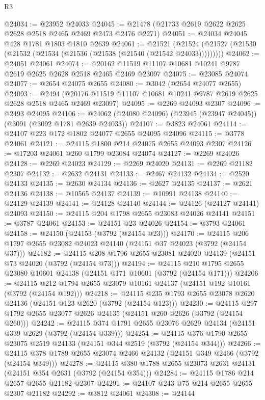 \begin{lexlean}{R3}
\begin{coremodule}
@24034 := @23952 @24033
@24045 := @21478 (@21733 @2619 @2622 @2625 @2628 @2518 @2465 @2469 @2473 @2476 @2271)
@24051 := @24034 @24045 @428 @1781 @1803 @1810 @2639
@24061 := @21521
    (@21524 (@21527 (@21530 (@21532 (@21534 (@21536 (@21538 (@21540 (@21542 @24033)))))))))
@24062 := @24051 @24061
@24074 := @20162 @11519 @11107 @10681 @10241 @9787 @2619 @2625 @2628 @2518 @2465 @2469 @23097
@24075 := @23085 @24074
@24077 := @2654 @24075 @2655
@24080 := @3042 (@2654 @24077 @2655)
@24093 := @2494
    (@20176 @11519 @11107 @10681 @10241 @9787 @2619 @2625 @2628 @2518 @2465 @2469 @23097)
@24095 := @2269 @24093 @2307
@24096 := @2493 @24095
@24106 := @24062 (@24080 @24096) (@23945 (@23947 @24045)) (@3091 (@3092 @1781 @2639 @24033))
@24107 := @3823 @24061
@24114 := @24107 @223 @172 @1802 @24077 @2655 @24095 @24096
@24115 := @3778 @24061
@24121 := @24115 @1800 @214 @24075 @2655 @24093 @2307
@24126 := @17203 @24061 @260 @1799 @23084 @24074
@24127 := @2269 @24026
@24128 := @2269 @24023
@24129 := @2269 @24020
@24131 := @2269 @21182 @2307
@24132 := @2632 @24131
@24133 := @2467 @24132
@24134 := @2520 @24133
@24135 := @2630 @24134
@24136 := @2627 @24135
@24137 := @2621 @24136
@24138 := @10565 @24137
@24139 := @10991 @24138
@24140 := @24129 @24139
@24141 := @24128 @24140
@24144 := @24126 (@24127 @24141) @24093
@24150 := @24115 @204 @1798 @2655 @23083 @24026 @24141
@24151 := @3787 @24061
@24153 := @24151 @23 @24026
@24154 := @3793 @24061
@24158 := @24150 (@24153 (@3792 (@24154 @23)))
@24170 := @24115 @206 @1797 @2655 @23082 @24023 @24140 (@24151 @37 @24023 (@3792 (@24154 @37)))
@24182 := @24115 @208 @1796 @2655 @23081 @24020 @24139 (@24151 @73 @24020 (@3792 (@24154 @73)))
@24194 := @24115 @210 @1795 @2655 @23080 @10601 @24138 (@24151 @171 @10601 (@3792 (@24154 @171)))
@24206 := @24115 @212 @1794 @2655 @23079 @10161 @24137 (@24151 @192 @10161 (@3792 (@24154 @192)))
@24218 := @24115 @235 @1793 @2655 @23078 @2620 @24136 (@24151 @123 @2620 (@3792 (@24154 @123)))
@24230 := @24115 @297 @1792 @2655 @23077 @2626 @24135 (@24151 @260 @2626 (@3792 (@24154 @260)))
@24242 := @24115 @374 @1791 @2655 @23076 @2629 @24134 (@24151 @339 @2629 (@3792 (@24154 @339)))
@24254 := @24115 @376 @1790 @2655 @23075 @2519 @24133 (@24151 @344 @2519 (@3792 (@24154 @344)))
@24266 := @24115 @378 @1789 @2655 @23074 @2466 @24132 (@24151 @349 @2466 (@3792 (@24154 @349)))
@24278 := @24115 @380 @1788 @2655 @23073 @2631 @24131 (@24151 @354 @2631 (@3792 (@24154 @354)))
@24284 := @24115 @1786 @214 @2657 @2655 @21182 @2307
@24291 := @24107 @243 @75 @214 @2655 @2655 @2307 @21182
@24292 := @3812 @24061
@24308 := @24144

\end{coremodule}
\end{lexlean}
